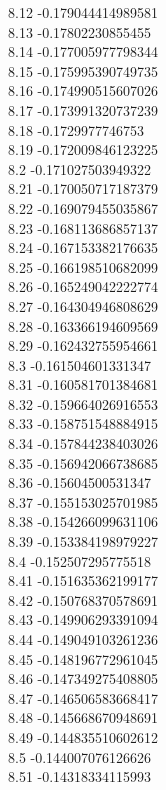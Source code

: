 {8.12	-0.179044414989581\\
8.13	-0.17802230855455\\
8.14	-0.177005977798344\\
8.15	-0.175995390749735\\
8.16	-0.174990515607026\\
8.17	-0.173991320737239\\
8.18	-0.1729977746753\\
8.19	-0.172009846123225\\
8.2	-0.171027503949322\\
8.21	-0.170050717187379\\
8.22	-0.169079455035867\\
8.23	-0.168113686857137\\
8.24	-0.167153382176635\\
8.25	-0.166198510682099\\
8.26	-0.165249042222774\\
8.27	-0.164304946808629\\
8.28	-0.163366194609569\\
8.29	-0.162432755954661\\
8.3	-0.161504601331347\\
8.31	-0.160581701384681\\
8.32	-0.159664026916553\\
8.33	-0.158751548884915\\
8.34	-0.157844238403026\\
8.35	-0.156942066738685\\
8.36	-0.15604500531347\\
8.37	-0.155153025701985\\
8.38	-0.154266099631106\\
8.39	-0.153384198979227\\
8.4	-0.152507295775518\\
8.41	-0.151635362199177\\
8.42	-0.150768370578691\\
8.43	-0.149906293391094\\
8.44	-0.149049103261236\\
8.45	-0.148196772961045\\
8.46	-0.147349275408805\\
8.47	-0.146506583668417\\
8.48	-0.145668670948691\\
8.49	-0.144835510602612\\
8.5	-0.144007076126626\\
8.51	-0.14318334115993\\
}
